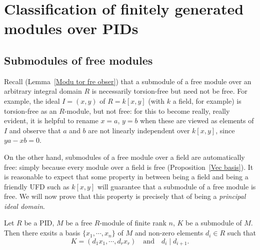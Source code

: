 \section{Classification of finitely generated modules over PIDs}
\subsection{Submodules of free modules}
Recall (Lemma~\ref{Modu tor fre obser}) that a submodule of a free module over an arbitrary integral domain $R$ is necessarily torsion-free but need not be free. For example, the ideal $I=(x,y)$ of $R=k[x,y]$ (with $k$ a field, for example) is torsion-free as an $R$-module, but not free: for this to become really, really evident, it is helpful to rename $x=a$, $y=b$ when these
are viewed as elements of $I$ and observe that $a$ and $b$ are not linearly independent over $k[x,y]$, since $ya-xb=0$.\par
On the other hand, submodules of a free module over a field are automatically free: simply because every module over a field is free (Proposition~\ref{Vec basis}). It is reasonable to expect that some property in between being a field and being a friendly UFD such as $k[x,y]$ will guarantee that a submodule of a free module is free. We will now prove that this property is precisely that of being a \textit{principal ideal domain}.
\begin{proposition}\label{PID submodule free}
Let $R$ be a PID, $M$ be a free $R$-module of finite rank $n$, $K$ be a submodule of $M$. Then there exsits a basis $\{x_1,\cdots,x_n\}$ of $M$ and non-zero elements $d_i\in R$ such that \[K=(d_1x_1,\cdots,d_rx_r)\quad\text{and}\quad d_{i}\mid d_{i+1}.\]
\end{proposition}
